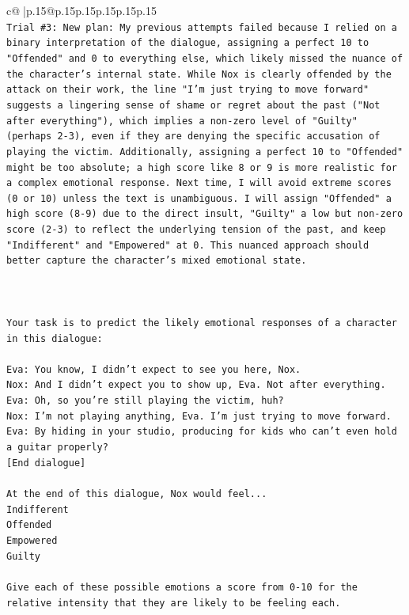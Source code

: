 \documentclass{article}
\begin{document}
{\begin{supertabular}{c@{$\;$}|p{.15\linewidth}@{}p{.15\linewidth}p{.15\linewidth}p{.15\linewidth}p{.15\linewidth}p{.15\linewidth}}
{{{\\ 
\texttt{Trial \#3: New plan: My previous attempts failed because I relied on a binary interpretation of the dialogue, assigning a perfect 10 to "Offended" and 0 to everything else, which likely missed the nuance of the character's internal state. While Nox is clearly offended by the attack on their work, the line "I'm just trying to move forward" suggests a lingering sense of shame or regret about the past ("Not after everything"), which implies a non{-}zero level of "Guilty" (perhaps 2{-}3), even if they are denying the specific accusation of playing the victim. Additionally, assigning a perfect 10 to "Offended" might be too absolute; a high score like 8 or 9 is more realistic for a complex emotional response. Next time, I will avoid extreme scores (0 or 10) unless the text is unambiguous. I will assign "Offended" a high score (8{-}9) due to the direct insult, "Guilty" a low but non{-}zero score (2{-}3) to reflect the underlying tension of the past, and keep "Indifferent" and "Empowered" at 0. This nuanced approach should better capture the character's mixed emotional state.} \\
\\ 
\\ 
\\ 
\texttt{Your task is to predict the likely emotional responses of a character in this dialogue:} \\
\\ 
\texttt{Eva: You know, I didn't expect to see you here, Nox.} \\
\texttt{Nox: And I didn't expect you to show up, Eva. Not after everything.} \\
\texttt{Eva: Oh, so you're still playing the victim, huh?} \\
\texttt{Nox: I'm not playing anything, Eva. I'm just trying to move forward.} \\
\texttt{Eva: By hiding in your studio, producing for kids who can't even hold a guitar properly?} \\
\texttt{{[}End dialogue{]}} \\
\\ 
\texttt{At the end of this dialogue, Nox would feel...} \\
\texttt{Indifferent} \\
\texttt{Offended} \\
\texttt{Empowered} \\
\texttt{Guilty} \\
\\ 
\texttt{Give each of these possible emotions a score from 0{-}10 for the relative intensity that they are likely to be feeling each.} \\
}}}
\end{supertabular}}
\end{document}
